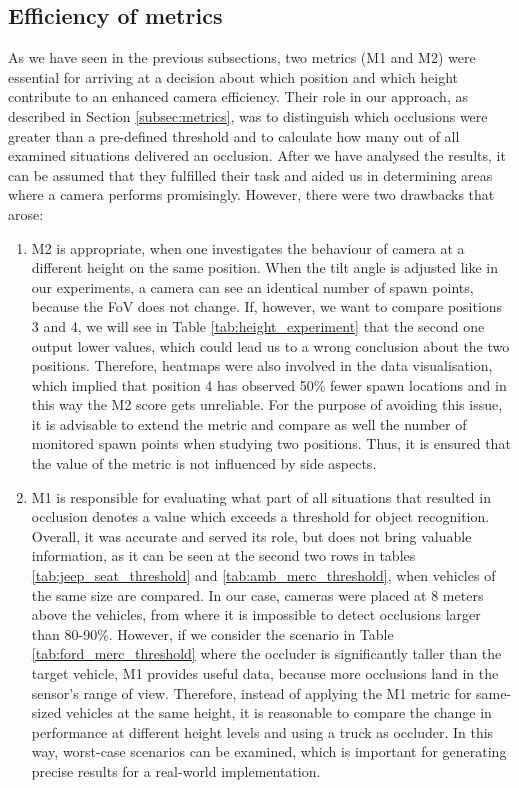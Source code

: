 \subsection{Efficiency of metrics}
As we have seen in the previous subsections, two metrics (M1 and M2) were essential for arriving at a decision about which position and which height contribute to an enhanced camera efficiency. Their role in our approach, as described in Section \ref{subsec:metrics}, was to distinguish which occlusions were greater than a pre-defined threshold and to calculate how many out of all examined situations delivered an occlusion. After we have analysed the results, it can be assumed that they fulfilled their task and aided us in determining areas where a camera performs promisingly. However, there were two drawbacks that arose:
\begin{enumerate}
    \item M2 is appropriate, when one investigates the behaviour of camera at a different height on the same position. When the tilt angle is adjusted like in our experiments, a camera can see an identical number of spawn points, because the FoV does not change. If, however, we want to compare positions 3 and 4, we will see in Table \ref{tab:height_experiment} that the second one output lower values, which could lead us to a wrong conclusion about the two positions. Therefore, heatmaps were also involved in the data visualisation, which implied that position 4 has observed 50\% fewer spawn locations and in this way the M2 score gets unreliable. For the purpose of avoiding this issue, it is advisable to extend the metric and compare as well the number of monitored spawn points when studying two positions. Thus, it is ensured that the value of the metric is not influenced by side aspects.
    \item M1 is responsible for evaluating what part of all situations that resulted in occlusion denotes a value which exceeds a threshold for object recognition. Overall, it was accurate and served its role, but does not bring valuable information, as it can be seen at the second two rows in tables \ref{tab:jeep_seat_threshold} and \ref{tab:amb_merc_threshold}, when vehicles of the same size are compared. In our case, cameras were placed at 8 meters above the vehicles, from where it is impossible to detect occlusions larger than 80-90\%. However, if we consider the scenario in Table \ref{tab:ford_merc_threshold} where the occluder is significantly taller than the target vehicle, M1 provides useful data, because more occlusions land in the sensor's range of view. Therefore, instead of applying the M1 metric for same-sized vehicles at the same height, it is reasonable to compare the change in performance at different height levels and using a truck as occluder. In this way, worst-case scenarios can be examined, which is important for generating precise results for a real-world implementation. 
\end{enumerate}
